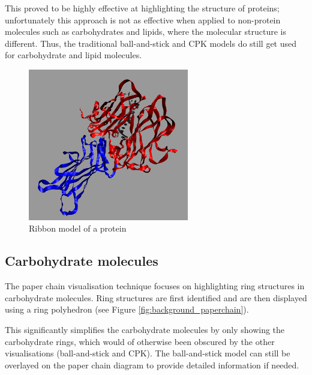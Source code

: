 This proved to be highly effective at highlighting the structure of proteins;
unfortunately this approach is not as effective when applied to non-protein
molecules such as carbohydrates and lipids, where the molecular structure is
different. Thus, the traditional ball-and-stick and CPK models do still get
used for carbohydrate and lipid molecules.

\begin{figure}[h!]
  \begin{center}
    \includegraphics[width=70mm]{ribbon}
  \end{center}
  \caption{Ribbon model of a protein}
  \label{fig:background_ribbon}
\end{figure}


\subsection{Carbohydrate molecules}
\label{sub:background_carbohydrate}

The paper chain visualisation technique \citep{kuttel06} focuses on
highlighting ring structures in carbohydrate molecules. Ring structures are
first identified and are then displayed using a ring polyhedron (see Figure
\ref{fig:background_paperchain}).

This significantly simplifies the carbohydrate molecules by only showing the
carbohydrate rings, which would of otherwise been obscured by the other
visualisations (ball-and-stick and CPK). The ball-and-stick model can still be
overlayed on the paper chain diagram to provide detailed information if needed.

